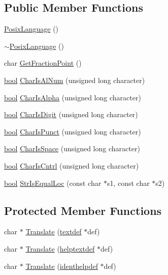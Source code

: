 \subsection*{Public Member Functions}
\begin{DoxyCompactItemize}
\item 
\hyperlink{classPosixLanguage_adec9134e7ac6b7519f9c0de05432a670}{Posix\+Language} ()
\item 
\hyperlink{classPosixLanguage_a66f5e21eff952730deaf82d3c5d09783}{$\sim$\+Posix\+Language} ()
\item 
char \hyperlink{classPosixLanguage_acf6ccbc2a09c783ce6088302e8ff23dc}{Get\+Fraction\+Point} ()
\item 
\hyperlink{platform_8h_a1062901a7428fdd9c7f180f5e01ea056}{bool} \hyperlink{classPosixLanguage_a08b3bcbf2303f731a3bc6e3b1bf8141d}{Char\+Is\+Al\+Num} (unsigned long character)
\item 
\hyperlink{platform_8h_a1062901a7428fdd9c7f180f5e01ea056}{bool} \hyperlink{classPosixLanguage_abfdafb73a75c0ce10f85e1129563d953}{Char\+Is\+Alpha} (unsigned long character)
\item 
\hyperlink{platform_8h_a1062901a7428fdd9c7f180f5e01ea056}{bool} \hyperlink{classPosixLanguage_abc97c9c309aea2bc7da3cdbc3e91b9a8}{Char\+Is\+Digit} (unsigned long character)
\item 
\hyperlink{platform_8h_a1062901a7428fdd9c7f180f5e01ea056}{bool} \hyperlink{classPosixLanguage_a5127a912a10757a323875503165b4f4e}{Char\+Is\+Punct} (unsigned long character)
\item 
\hyperlink{platform_8h_a1062901a7428fdd9c7f180f5e01ea056}{bool} \hyperlink{classPosixLanguage_a001153a40ba8555a914661495b6879ad}{Char\+Is\+Space} (unsigned long character)
\item 
\hyperlink{platform_8h_a1062901a7428fdd9c7f180f5e01ea056}{bool} \hyperlink{classPosixLanguage_a03e67ea023e9cdc9f57034a620513ade}{Char\+Is\+Cntrl} (unsigned long character)
\item 
\hyperlink{platform_8h_a1062901a7428fdd9c7f180f5e01ea056}{bool} \hyperlink{classPosixLanguage_a5d9a71c26234345a5266314efbeaba6f}{Str\+Is\+Equal\+Loc} (const char $\ast$s1, const char $\ast$s2)
\end{DoxyCompactItemize}
\subsection*{Protected Member Functions}
\begin{DoxyCompactItemize}
\item 
char $\ast$ \hyperlink{classPosixLanguage_af8a375ee3116dc2bc8970074f0cc5531}{Translate} (\hyperlink{structtextdef}{textdef} $\ast$def)
\item 
char $\ast$ \hyperlink{classPosixLanguage_a188eddf1911e19c8bbe520f1637e9ae8}{Translate} (\hyperlink{structhelptextdef}{helptextdef} $\ast$def)
\item 
char $\ast$ \hyperlink{classPosixLanguage_a7a7c9c1974b029707206bd2089afcd59}{Translate} (\hyperlink{structidenthelpdef}{identhelpdef} $\ast$def)
\end{DoxyCompactItemize}
